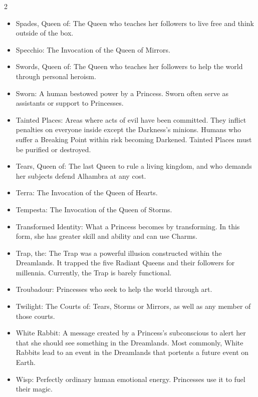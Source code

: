 \begin{multicols}{2}
\begin{itemize}
  \item Spades, Queen of: The Queen who teaches her followers to live free and think outside of the box. 
  \item Specchio: The Invocation of the Queen of Mirrors.
  \item Swords, Queen of: The Queen who teaches her followers to help the world through personal heroism.
  \item Sworn: A human bestowed power by a Princess. Sworn often serve as assistants or support to Princesses. 
  \item Tainted Places: Areas where acts of evil have been committed. They inflict penalties on everyone inside except the Darkness's minions. Humans who suffer a Breaking Point within risk becoming Darkened. Tainted Places must be purified or destroyed. 
  \item Tears, Queen of: The last Queen to rule a living kingdom, and who demands her subjects defend Alhambra at any cost. 
  \item Terra: The Invocation of the Queen of Hearts.
  \item Tempesta: The Invocation of the Queen of Storms.
  \item Transformed Identity: What a Princess becomes by transforming. In this form, she has greater skill and ability and can use Charms. 
  \item Trap, the: The Trap was a powerful illusion constructed within the Dreamlands. It trapped the five Radiant Queens and their followers for millennia. Currently, the Trap is barely functional.
  \item Troubadour: Princesses who seek to help the world through art. 
  \item Twilight: The Courts of: Tears, Storms or Mirrors, as well as any member of those courts. 
  \item White Rabbit: A message created by a Princess's subconscious to alert her that she should see something in the Dreamlands. Most commonly, White Rabbits lead to an event in the Dreamlands that portents a future event on Earth. 
  \item Wisp: Perfectly ordinary human emotional energy. Princesses use it to fuel their magic. 
\end{itemize}

\end{multicols}
